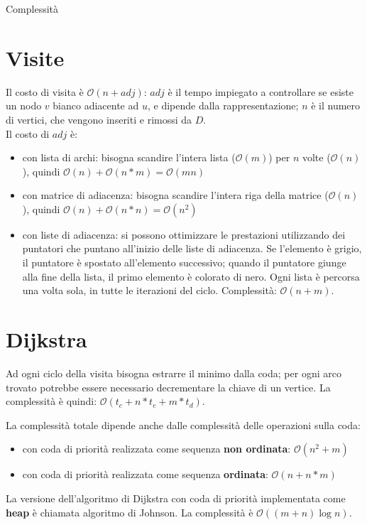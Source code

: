 \documentclass[11pt]{article}
\begin{document}
\begin{center}
    \Large{Complessità}
\end{center}
\section*{Visite}
Il costo di visita è $\mathcal{O}(n+adj)$: $adj$ è il tempo impiegato a controllare se esiste un nodo $v$ bianco adiacente 
ad $u$, e dipende dalla rappresentazione; $n$ è il numero di vertici, che vengono inseriti e rimossi da $D$.\\
Il costo di $adj$ è:
\begin{itemize}
    \item con lista di archi: bisogna scandire l'intera lista ($\mathcal{O}(m)$) per $n$ volte ($\mathcal{O}(n)$), quindi 
    $\mathcal{O}(n)+\mathcal{O}(n*m)=\mathcal{O}(mn)$
    \item con matrice di adiacenza: bisogna scandire l'intera riga della matrice ($\mathcal{O}(n)$), quindi $\mathcal{O}(n)+\mathcal{O}(n*n)=\mathcal{O}(n^2)$
    \item con liste di adiacenza: si possono ottimizzare le prestazioni utilizzando dei puntatori che puntano all'inizio 
    delle liste di adiacenza. Se l'elemento è grigio, il puntatore è spostato all'elemento successivo; quando il puntatore 
    giunge alla fine della lista, il primo elemento è colorato di nero. Ogni lista è percorsa una volta sola, in tutte le 
    iterazioni del ciclo. Complessità: $\mathcal{O}(n+m)$.
\end{itemize}
\section*{Dijkstra}
Ad ogni ciclo della visita bisogna estrarre il minimo dalla coda; per ogni arco trovato potrebbe essere necessario decrementare 
la chiave di un vertice. La complessità è quindi: $\mathcal{O}(t_c+n*t_e+m*t_d)$.

La complessità totale dipende anche dalle complessità delle operazioni sulla coda:
\begin{itemize}
    \item con coda di priorità realizzata come sequenza \textbf{non ordinata}: $\mathcal{O}(n^2+m)$
    \item con coda di priorità realizzata come sequenza \textbf{ordinata}: $\mathcal{O}(n+n*m)$
\end{itemize}
La versione dell'algoritmo di Dijkstra con coda di priorità implementata come \textbf{heap} è chiamata algoritmo di Johnson.
La complessità è $\mathcal{O}((m+n)\log n)$.
\end{document}
